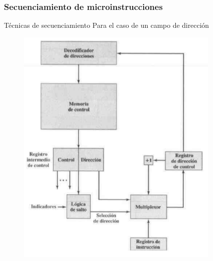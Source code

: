 \documentclass{beamer}
\begin{document}
\begin{frame}
	\frametitle{Secuenciamiento de microinstrucciones}
	\begin{block}{Técnicas de secuenciamiento}
	Para el caso de un campo de dirección
	\end{block}	
	\begin{figure}[H]
		\centering
		\includegraphics[scale=0.3]{imagenes/uncampo.png} 
	\end{figure}
\end{frame}
\end{document}
